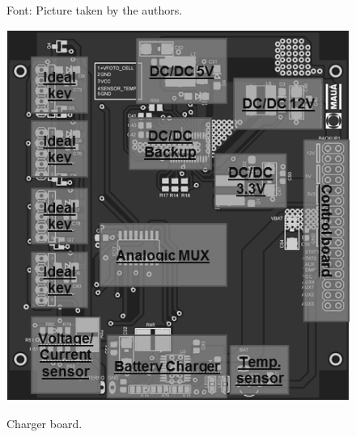 \documentclass[3p]{elsarticle}
\begin{document}
\begin{figure}[th]
\begin{minipage}[b]{0.3\textwidth}
	    \begin{footnotesize}
		Font: Picture taken by the authors.
		\end{footnotesize}
	  \end{minipage}
	  \hfill
	  \begin{minipage}[b]{0.3\textwidth}
		\label{control}
		\centering
		\includegraphics[width=1\linewidth]{./figs/charger}
	    \caption{Charger board.}
	    

\end{minipage}
\end{figure}
\end{document}
